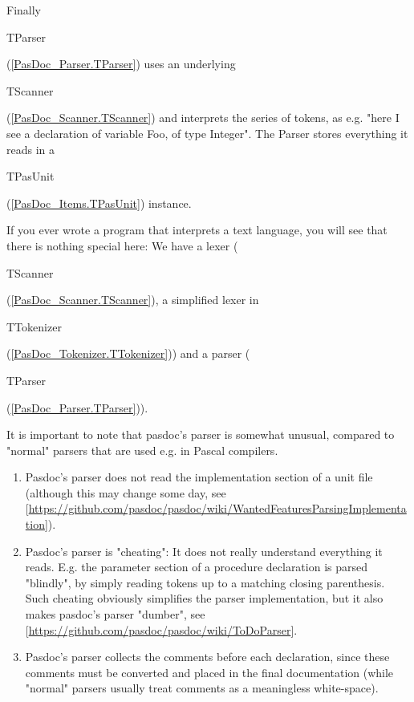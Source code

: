 \documentclass{report}
\begin{document}
Finally \begin{ttfamily}TParser\end{ttfamily}(\ref{PasDoc_Parser.TParser}) uses an underlying \begin{ttfamily}TScanner\end{ttfamily}(\ref{PasDoc_Scanner.TScanner}) and interprets the series of tokens, as e.g. "here I see a declaration of variable Foo, of type Integer". The Parser stores everything it reads in a \begin{ttfamily}TPasUnit\end{ttfamily}(\ref{PasDoc_Items.TPasUnit}) instance.

If you ever wrote a program that interprets a text language, you will see that there is nothing special here: We have a lexer (\begin{ttfamily}TScanner\end{ttfamily}(\ref{PasDoc_Scanner.TScanner}), a simplified lexer in \begin{ttfamily}TTokenizer\end{ttfamily}(\ref{PasDoc_Tokenizer.TTokenizer})) and a parser (\begin{ttfamily}TParser\end{ttfamily}(\ref{PasDoc_Parser.TParser})).

It is important to note that pasdoc's parser is somewhat unusual, compared to "normal" parsers that are used e.g. in Pascal compilers.

\begin{enumerate}
\setcounter{enumi}{0} \setcounter{enumii}{0} \setcounter{enumiii}{0} \setcounter{enumiv}{0} 
\item  Pasdoc's parser does not read the implementation section of a unit file (although this may change some day, see [\href{https://github.com/pasdoc/pasdoc/wiki/WantedFeaturesParsingImplementation}{https://github.com/pasdoc/pasdoc/wiki/WantedFeaturesParsingImplementation}]).
\setcounter{enumi}{1} \setcounter{enumii}{1} \setcounter{enumiii}{1} \setcounter{enumiv}{1} 
\item  Pasdoc's parser is "cheating": It does not really understand everything it reads. E.g. the parameter section of a procedure declaration is parsed "blindly", by simply reading tokens up to a matching closing parenthesis. Such cheating obviously simplifies the parser implementation, but it also makes pasdoc's parser "dumber", see [\href{https://github.com/pasdoc/pasdoc/wiki/ToDoParser}{https://github.com/pasdoc/pasdoc/wiki/ToDoParser}].
\setcounter{enumi}{2} \setcounter{enumii}{2} \setcounter{enumiii}{2} \setcounter{enumiv}{2} 
\item  Pasdoc's parser collects the comments before each declaration, since these comments must be converted and placed in the final documentation (while "normal" parsers usually treat comments as a meaningless white{-}space).
\end{enumerate}
\end{document}

